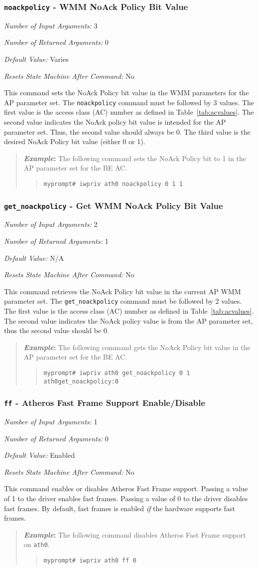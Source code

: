 \documentclass[10pt,fullpage]{article}
\newcommand{\mytt}[1]{{\texttt{#1}}}
\newcommand{\bv}{\begin{verse}}
\newcommand{\ev}{\end{verse}}
\newcommand{\cmd}[1]{{\texttt{myprompt\# #1}}}
\newcommand{\argdesc}[4]{\begin{description}
\itemsep -6pt
\item \textit{Number of Input Arguments:} #1
\item \textit{Number of Returned Arguments:} #2
\item \textit{Default Value:} #3
\item \textit{Resets State Machine After Command:} #4
\end{description}
}
\newenvironment{example}{\begin{quote}\textbf{\textit{Example}:}}{\end{quote}}
\begin{document}
\subsubsection{\mytt{noackpolicy} - WMM NoAck Policy Bit Value}
\argdesc{3}{0}{Varies}{No}
This command sets the NoAck Policy bit value in the WMM parameters for
the AP parameter set.  The \mytt{noackpolicy} command must be followed
by 3 values.  The first value is the access class (AC) number as
defined in Table~\ref{tab:acvalues}.  The second value indicates the
NoAck policy bit value is intended for the AP parameter set.  Thus,
the second value should always be 0.  The third value is the desired
NoAck Policy bit value (either 0 or 1).
\begin{example}
  The following command sets the NoAck Policy bit to 1 in the AP
  parameter set for the BE AC.
  \bv
  \cmd{iwpriv ath0 noackpolicy 0 1 1}
  \ev
\end{example}

\subsubsection{\mytt{get\_noackpolicy} - Get WMM NoAck Policy Bit Value}
\argdesc{2}{1}{N/A}{No}
This command retrieves the NoAck Policy bit value in the current AP
WMM parameter set.  The \mytt{get\_noackpolicy} command must be
followed by 2 values.  The first value is the access class (AC) number
as defined in Table~\ref{tab:acvalues}.  The second value indicates
the NoAck policy value is from the AP parameter set, thus the second
value should be 0.
\begin{example}
  The following command gets the NoAck Policy bit value in the AP
  parameter set for the BE AC.
  \bv
  \cmd{iwpriv ath0 get\_noackpolicy 0 1}\\
  \mytt{ath0\hspace{32pt}get\_noackpolicy:0}
  \ev
\end{example}

\subsubsection{\mytt{ff} - Atheros Fast Frame Support Enable/Disable}
\argdesc{1}{0}{Enabled}{No}
This command enables or disables Atheros Fast Frame support. Passing a
value of 1 to the driver enables fast frames. Passing a value of 0 to
the driver disables fast frames.  By default, fast frames is enabled
\emph{if} the hardware supports fast frames.
\begin{example}
The following command disables Atheros Fast Frame support on
\mytt{ath0}.
\bv
\cmd{iwpriv ath0 ff 0}
\ev
\end{example}
\end{document}
